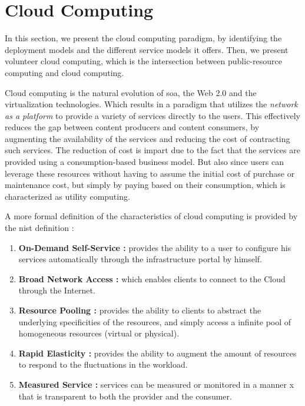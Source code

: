 \documentclass[12pt, titlepage]{uo_temp}
\begin{document}
     \section{Cloud Computing}
     In this section, we present the cloud computing paradigm, by identifying the
     deployment models and the different service models it offers. Then, we present
     volunteer cloud computing, which is the intersection between public-resource
     computing and cloud computing.  

     Cloud computing is the natural evolution of \gls{soa}, the Web
     2.0 and the virtualization technologies. Which results in a paradigm that utilizes
     the \emph{network as a platform} to provide a variety of services directly to the
     users. This effectively reduces the gap between content producers and content consumers,
     by augmenting the availability of the services and reducing the cost of contracting
     such services. The reduction of cost is impart due to the fact that the services are
     provided using a consumption-based business model. But also since users can leverage
     these resources without having to assume the initial cost of purchase or maintenance
     cost, but simply by paying based on their consumption, which is characterized as
     utility computing. 

     A more formal definition of the characteristics of cloud computing is provided by the
     \gls{nist} definition \cite{nist}:
     \begin{enumerate}
     \item \textbf{On-Demand Self-Service :} provides the ability to a user to configure his
       services automatically through the infrastructure portal by himself.
     \item \textbf{Broad Network Access :} which enables clients to connect to the Cloud
       through the Internet.
     \item \textbf{Resource Pooling :} provides the ability to clients to abstract the
       underlying specificities of the resources, and simply access a infinite pool of
       homogeneous resources (virtual or physical).
     \item \textbf{Rapid Elasticity :} provides the ability to augment the amount of
       resources to respond to the fluctuations in the workload.
     \item \textbf{Measured Service :} services can be measured or monitored in a manner
x       that is transparent to both the provider and the consumer.
     \end{enumerate}
     
\end{document}
